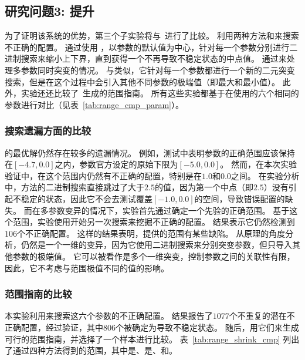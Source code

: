 \subsection{研究问题3: 提升}
为了证明该系统的优势，第三个子实验将\icsearcher 与~\cite{rvfuzzer}进行了比较。
利用两种方法和来搜索不正确的配置。
通过使用 ，以参数的默认值为中心，针对每一个参数分别进行二进制搜索来缩小上下界，直到获得一个不再导致不稳定状态的中点值。
通过来处理多参数同时突变的情况。
与类似，它针对每一个参数都进行一个新的二元突变搜索，但是在这个过程中会引入其他不同参数的极端值（即最大和最小值）。
此外，实验还还比较了~\cite{han2022control}生成的范围指南。
所有这些实验都基于在使用的六个相同的参数进行对比（见表~\ref{tab:range_cmp_param}）。




\subsubsection{搜索遗漏方面的比较}
的最优解仍然存在较多的遗漏情况。
例如，测试中表明参数的正确范围应该保持在$[-4.7, 0.0]$之内，参数官方设定的原始下限为$[-5.0,0.0]$。
然而，在本次实验验证中，在这个范围内仍然有不正确的配置，特别是在$1.0$和$0.0$之间。
在实验分析中，方法的二进制搜索直接跳过了大于$2.5$的值，因为第一个中点（即$2.5$）没有引起不稳定的状态，因此它不会去测试覆盖$[-1.0,0.0]$的空间，导致错误配置的缺失。
而在多参数变异的情况下，实验首先通过确定一个先验的正确范围。
基于这个范围，实验使用\icsearcher 开始另一次搜索来挖掘不正确的配置。
结果表示它仍然检测到$106$个不正确配置。
这样的结果表明，提供的范围有某些缺陷。
从原理的角度分析，仍然是一个一维的变异，因为它使用二进制搜索来分别突变参数，但只导入其他参数的极端值。
它可以被看作是多个一维突变，控制参数之间的关联性有限，因此，它不考虑与范围极值不同的值的影响。
    
\subsubsection{范围指南的比较}
本实验利用\icsearcher 来搜索这六个参数的不正确配置。
结果报告了$1077$个不重复的潜在不正确配置，经过验证，其中$806$个被确定为导致不稳定状态。
随后，\icsearcher 用它们来生成可行的范围指南，并选择了一个样本进行比较。
表~\ref{tab:range_shrink_cmp} 列出了通过四种方法得到的范围，其中是、是、和\icsearcher 。

